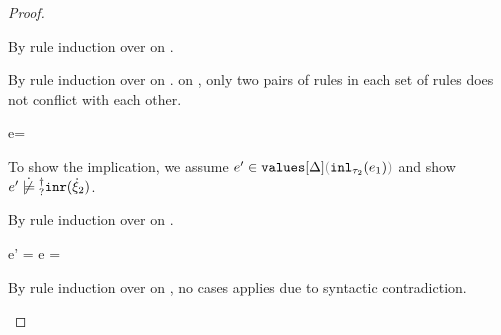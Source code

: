 \begin{proof}
\begin{byCases}
      By rule induction over  on .
      \begin{byCases}
        \item[\text{(\ref{rule:FVal})}]
          \begin{pfsteps}
          \item {}  
          \end{pfsteps}
          By rule induction over  on .
           on , only two pairs of rules in each set
          of rules does not conflict with each other.
          \begin{byCases}
            \item[\text{(\ref{rule:VInl}, \ref{rule:TInl})}]
              \begin{pfsteps}
              \item e= 
              \end{pfsteps}
              To show the implication, we assume $\inValues{e'}{\Delta}{\hinl{\tau_2}{e_1}}$ and show $\cnotsatisfyormay{e'}{\cinr{\hxi_2}}$.
              \begin{pfsteps}
              \item {}  
              \end{pfsteps}
              By rule induction over  on .
              \begin{byCases}
                \item[\text{(\ref{rule:IVVal})}]
                \begin{pfsteps}
                \item e' = e =  
                \item {} 
                \end{pfsteps}

                \item[\text{(\ref{rule:IVIndet})}]
                  \begin{pfsteps}
                  \item {}  
                  \end{pfsteps}
                  By rule induction over  on
                  , no cases applies due to syntactic contradiction.


\end{byCases}
\end{byCases}
\end{byCases}
\end{byCases}
\end{proof}
